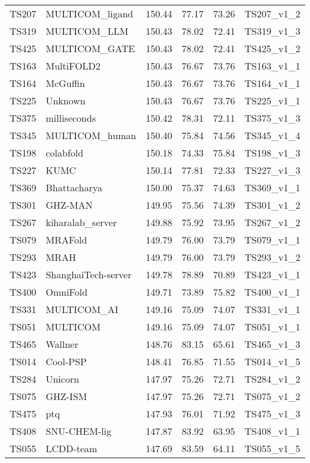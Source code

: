 \begin{longtable}{llllll}
TS207 & MULTICOM\_ligand & 150.44 & 77.17 & 73.26 & TS207\_v1\_2 \\ 
TS319 & MULTICOM\_LLM & 150.43 & 78.02 & 72.41 & TS319\_v1\_3 \\ 
TS425 & MULTICOM\_GATE & 150.43 & 78.02 & 72.41 & TS425\_v1\_2 \\ 
TS163 & MultiFOLD2 & 150.43 & 76.67 & 73.76 & TS163\_v1\_1 \\ 
TS164 & McGuffin & 150.43 & 76.67 & 73.76 & TS164\_v1\_1 \\ 
TS225 & Unknown & 150.43 & 76.67 & 73.76 & TS225\_v1\_1 \\ 
TS375 & milliseconds & 150.42 & 78.31 & 72.11 & TS375\_v1\_3 \\ 
TS345 & MULTICOM\_human & 150.40 & 75.84 & 74.56 & TS345\_v1\_4 \\ 
TS198 & colabfold & 150.18 & 74.33 & 75.84 & TS198\_v1\_3 \\ 
TS227 & KUMC & 150.14 & 77.81 & 72.33 & TS227\_v1\_3 \\ 
TS369 & Bhattacharya & 150.00 & 75.37 & 74.63 & TS369\_v1\_1 \\ 
TS301 & GHZ-MAN & 149.95 & 75.56 & 74.39 & TS301\_v1\_2 \\ 
TS267 & kiharalab\_server & 149.88 & 75.92 & 73.95 & TS267\_v1\_2 \\ 
TS079 & MRAFold & 149.79 & 76.00 & 73.79 & TS079\_v1\_1 \\ 
TS293 & MRAH & 149.79 & 76.00 & 73.79 & TS293\_v1\_2 \\ 
TS423 & ShanghaiTech-server & 149.78 & 78.89 & 70.89 & TS423\_v1\_1 \\ 
TS400 & OmniFold & 149.71 & 73.89 & 75.82 & TS400\_v1\_1 \\ 
TS331 & MULTICOM\_AI & 149.16 & 75.09 & 74.07 & TS331\_v1\_1 \\ 
TS051 & MULTICOM & 149.16 & 75.09 & 74.07 & TS051\_v1\_1 \\ 
TS465 & Wallner & 148.76 & 83.15 & 65.61 & TS465\_v1\_3 \\ 
TS014 & Cool-PSP & 148.41 & 76.85 & 71.55 & TS014\_v1\_5 \\ 
TS284 & Unicorn & 147.97 & 75.26 & 72.71 & TS284\_v1\_2 \\ 
TS075 & GHZ-ISM & 147.97 & 75.26 & 72.71 & TS075\_v1\_2 \\ 
TS475 & ptq & 147.93 & 76.01 & 71.92 & TS475\_v1\_3 \\ 
TS408 & SNU-CHEM-lig & 147.87 & 83.92 & 63.95 & TS408\_v1\_1 \\ 
TS055 & LCDD-team & 147.69 & 83.59 & 64.11 & TS055\_v1\_5 \\ 

\end{longtable}
